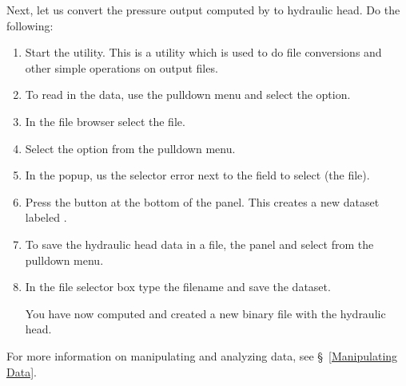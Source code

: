 Next, let us convert the pressure output computed by \parflow{}
to hydraulic head.
Do the following:
\begin{enumerate}

\item
Start the  utility.
This is a utility which is used to do file conversions and other simple
operations on \parflow{} output files.

\item
To read in the data, use the  pulldown menu and select the
  option.  

\item
In the file browser select the 
file.

\item

Select the  option from the  
pulldown menu.

\item 

In the  popup, us the selector error next to
the  field to select  (the
 file).

\item 

Press the  button at the bottom of the panel.  This
creates a new dataset labeled . 

\item
To save the hydraulic head data in a \parflow{} file,
 the  panel and select 
from the  pulldown menu.

\item

In the file selector box type the filename
and save the dataset.  

You have now computed and created a new \parflow{} binary file with the
hydraulic head.

\end{enumerate}
For more information on manipulating and analyzing \parflow{} data,
see \S~\ref{Manipulating Data}.

